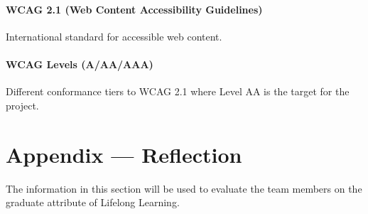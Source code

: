 \documentclass[12pt, titlepage]{article}
\begin{document}
\paragraph*{WCAG 2.1 (Web Content Accessibility Guidelines)}
International standard for accessible web content.

\paragraph*{WCAG Levels (A/AA/AAA)}
Different conformance tiers to WCAG 2.1 where Level AA is the target
for the project.

\newpage{}
\section*{Appendix --- Reflection}

The information in this section will be used to evaluate the team members on the
graduate attribute of Lifelong Learning.


\\
\end{document}
